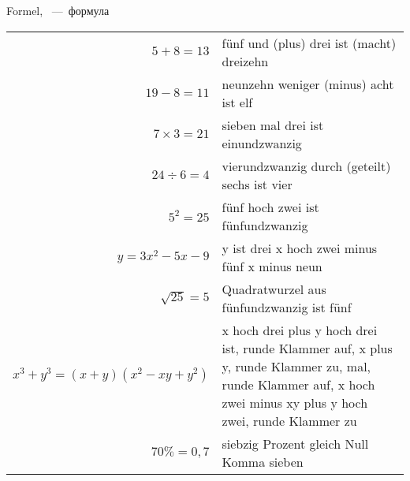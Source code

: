 
 Formel, ~---~формула

\begin{longtable}{rp{7cm}}
$5 + 8 = 13$ & f\"unf und (plus) drei ist (macht) dreizehn \\
$19 - 8 = 11$ & neunzehn weniger (minus) acht ist elf \\
$7 \times 3 = 21$ & sieben mal drei ist einundzwanzig \\
$24 \div 6 = 4$ & vierundzwanzig durch (geteilt) sechs ist vier \\
$5^2 = 25$ & f\"unf hoch zwei ist fünfundzwanzig \\
$y = 3x^2 - 5x - 9$ & y ist drei x hoch zwei minus f\"unf x minus neun \\
$\sqrt{25} = 5$ & Quadratwurzel aus f\"unfundzwanzig ist f\"unf \\
$x^3 + y^3 = (x + y)(x^2 - xy + y^2)$ & x hoch drei plus y hoch drei ist, runde Klammer auf, x plus y, runde Klammer zu, mal, runde Klammer auf, x hoch zwei minus xy plus y hoch zwei, runde Klammer zu \\
$70\% = 0,7$ & siebzig Prozent gleich Null Komma sieben
\end{longtable}
